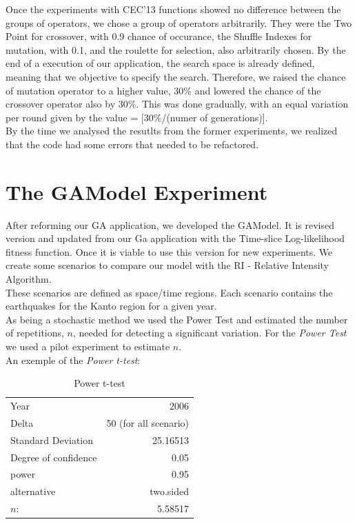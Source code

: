 Once the experiments with CEC'13 functions showed no difference between the groups of operators, we chose a group of operators arbitrarily. They were the Two Point for crossover, with 0.9 chance of occurance, the Shuffle Indexes for mutation, with 0.1, and the roulette for selection, also arbitrarily chosen. By the end of a execution of our application, the search space is already defined, meaning that we objective to specify the search. Therefore, we raised the chance of mutation operator to a higher value, 30\% and lowered the chance of the crossover operator also by 30\%. This was done gradually, with an equal variation per round given by the value = [30\%/(numer of generations)].\\

By the time we analysed the resutlts from the former experiments, we realized that the code had some errors that needed to be refactored.\\

\section{The GAModel Experiment}
	After reforming our GA application, we developed the GAModel. It is revised version and updated from our Ga application with the Time-slice Log-likelihood fitness function. Once it is viable to use this version for new experiments. We create some scenarios to compare our model with the RI - Relative Intensity Algorithm.\\
	
	These scenarios are defined as space/time regions. Each scenario contains the earthquakes for the Kanto region for a given year.\\
	
	As being a stochastic method we used the Power Test and estimated the number of repetitions, $n$, needed for detecting a significant variation. For the  {\it Power Test} we used a pilot experiment to estimate $n$.\\
	
	An exemple of the  {\it Power t-test}:

\begin{table}[!h]
  \begin{center}
  \begin{tabular}{|l|r|}
    \hline
    Year & 2006\\
    Delta & 50 (for all scenario)\\
    Standard Deviation &  25.16513\\
    Degree of confidence & 0.05\\
    power & 0.95\\
    alternative & two.sided\\
    \hline
    $n$: & 5.58517\\
    \hline    
  \end{tabular}
  \end{center}
  \caption{Power t-test}
  \label{power}
\end{table}

